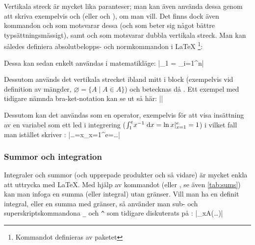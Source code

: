 \documentclass[lang=sv,ptsize=10pt,font=none,nomath,titles=bf,../../a4.tex]{subfiles}
\begin{document}
Vertikala streck är mycket lika paranteser; man kan även använda dessa
genom att skriva exempelvis  och  (eller
 och ), om man
vill. Det
finns dock även kommandon  och  som motsvarar dessa
(och som beter sig något bättre typsättningsmässigt),
samt  och  som motsvarar dubbla vertikala streck.
Man kan således definiera absolutbelopps- och normkommandon i \LaTeX%
\footnote{Kommandot  definieras av paketet
}:
\begin{latexcode}
\DeclarePairedDelimiter\abs{\lvert}{\rvert}
\DeclarePairedDelimiter\norm{\lVert}{\rVert}
\end{latexcode}
\label{cmd:declarepaireddelimiter}
Dessa kan sedan enkelt användas i matematikläge:
\latex|_1 = \sum_{i=1}^n|

Dessutom används det vertikala strecket ibland mitt i block (exempelvis
vid definition av mängder, \(\varnothing = \{A \mid A \in A\}\)) och
betecknas då . Ett exempel med tidigare nämnda bra-ket-notation
kan se ut så här: \label{sec:3:mid}
\latex|\left\langle\psi\mid\Psi\right\rangle|

Dessutom kan det användas som en operator,
exempelvis för att visa insättning av en variabel som ett led i
integrering (\(\int_1^e\! x^{-1}\d{x}=\ln x\vert_{x=1}^e=1 \)) i vilket
fall man istället skriver :
\latex|\ldots=\ln x\vert_{x=1}^e=\ldots|

\subsubsection{Summor och integration}
Integraler och summor (och upprepade produkter och så vidare) är mycket
enkla att uttrycka med \LaTeX{}. Med hjälp av kommandot  (eller
, se även \cref{tab:sums}) kan man infoga en summa (eller
integral) utan gränser. Vill man ha en definit integral, eller en summa
med gränser, så använder man sub- och superskriptskommandona \verb|_| och
\verb|^| som tidigare diskuterats på :
\latex|\sum_{x\in A}\left(\ldots\right)|
\end{document}
